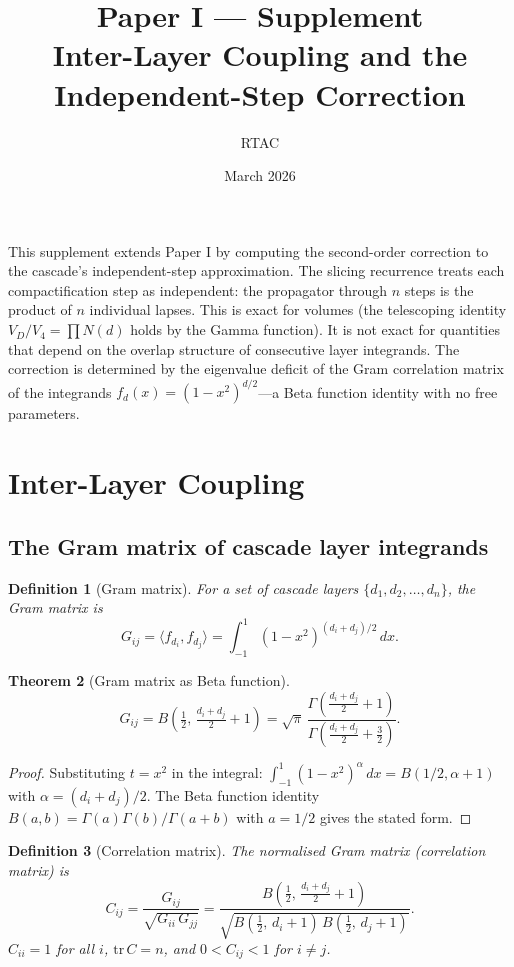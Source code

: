\documentclass[12pt,a4paper]{article}
\title{Paper I --- Supplement\\[6pt]
\large Inter-Layer Coupling and the Independent-Step Correction}
\author{RTAC}
\date{March 2026}
\newtheorem{theorem}{Theorem}[section]
\newtheorem{definition}[theorem]{Definition}
\theoremstyle{remark}
\begin{document}
\maketitle

\noindent This supplement extends Paper I by computing the second-order correction to the cascade's independent-step approximation. The slicing recurrence treats each compactification step as independent: the propagator through $n$ steps is the product of $n$ individual lapses. This is exact for volumes (the telescoping identity $V_D/V_4 = \prod N(d)$ holds by the Gamma function). It is not exact for quantities that depend on the overlap structure of consecutive layer integrands. The correction is determined by the eigenvalue deficit of the Gram correlation matrix of the integrands $f_d(x) = (1 - x^2)^{d/2}$---a Beta function identity with no free parameters.

\setcounter{section}{14}
\section{Inter-Layer Coupling}

\subsection{The Gram matrix of cascade layer integrands}

\begin{definition}[Gram matrix]
For a set of cascade layers $\{d_1, d_2, \ldots, d_n\}$, the Gram matrix is
\[
G_{ij} = \langle f_{d_i}, f_{d_j} \rangle = \int_{-1}^{1} (1 - x^2)^{(d_i + d_j)/2}\, dx.
\]
\end{definition}

\begin{theorem}[Gram matrix as Beta function]\label{thm:gram}
\[
G_{ij} = B\!\left(\tfrac{1}{2},\, \tfrac{d_i + d_j}{2} + 1\right) = \sqrt{\pi}\, \frac{\Gamma\!\left(\frac{d_i + d_j}{2} + 1\right)}{\Gamma\!\left(\frac{d_i + d_j}{2} + \frac{3}{2}\right)}.
\]
\end{theorem}

\begin{proof}
Substituting $t = x^2$ in the integral: $\int_{-1}^{1}(1 - x^2)^\alpha\, dx = B(1/2, \alpha + 1)$ with $\alpha = (d_i + d_j)/2$. The Beta function identity $B(a,b) = \Gamma(a)\Gamma(b)/\Gamma(a+b)$ with $a = 1/2$ gives the stated form.
\end{proof}

\begin{definition}[Correlation matrix]
The normalised Gram matrix (correlation matrix) is
\[
C_{ij} = \frac{G_{ij}}{\sqrt{G_{ii}\, G_{jj}}} = \frac{B\!\left(\frac{1}{2},\, \frac{d_i + d_j}{2} + 1\right)}{\sqrt{B\!\left(\frac{1}{2},\, d_i + 1\right)\, B\!\left(\frac{1}{2},\, d_j + 1\right)}}.
\]
$C_{ii} = 1$ for all $i$, $\mathrm{tr}\, C = n$, and $0 < C_{ij} < 1$ for $i \neq j$.
\end{definition}
\end{document}
